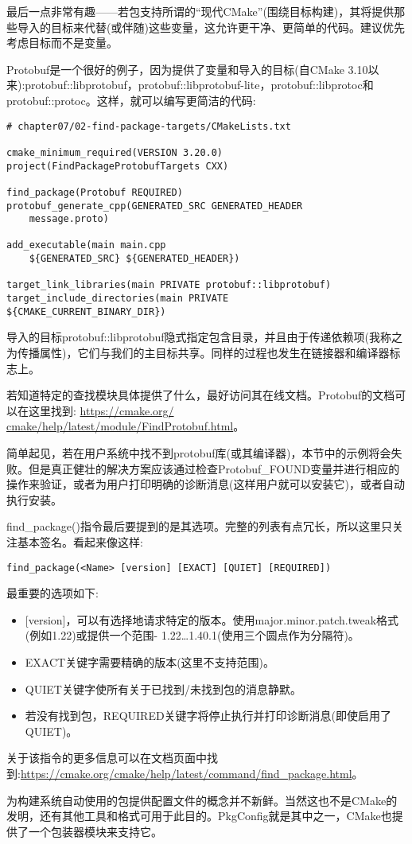 最后一点非常有趣——若包支持所谓的“现代CMake”(围绕目标构建)，其将提供那些导入的目标来代替(或伴随)这些变量，这允许更干净、更简单的代码。建议优先考虑目标而不是变量。

Protobuf是一个很好的例子，因为提供了变量和导入的目标(自CMake 3.10以来):protobuf::libprotobuf，protobuf::libprotobuf-lite，protobuf::libprotoc和protobuf::protoc。这样，就可以编写更简洁的代码:

\begin{lstlisting}[style=styleCMake]
# chapter07/02-find-package-targets/CMakeLists.txt

cmake_minimum_required(VERSION 3.20.0)
project(FindPackageProtobufTargets CXX)

find_package(Protobuf REQUIRED)
protobuf_generate_cpp(GENERATED_SRC GENERATED_HEADER
	message.proto)

add_executable(main main.cpp
	${GENERATED_SRC} ${GENERATED_HEADER})
	
target_link_libraries(main PRIVATE protobuf::libprotobuf)
target_include_directories(main PRIVATE
${CMAKE_CURRENT_BINARY_DIR})
\end{lstlisting}

导入的目标protobuf::libprotobuf隐式指定包含目录，并且由于传递依赖项(我称之为传播属性)，它们与我们的主目标共享。同样的过程也发生在链接器和编译器标志上。

若知道特定的查找模块具体提供了什么，最好访问其在线文档。Protobuf的文档可以在这里找到: \url{https://cmake.org/ cmake/help/latest/module/FindProtobuf.html}。

\begin{tcolorbox}[colback=blue!5!white,colframe=blue!75!black,title=重要的Note]
简单起见，若在用户系统中找不到protobuf库(或其编译器)，本节中的示例将会失败。但是真正健壮的解决方案应该通过检查Protobuf\_FOUND变量并进行相应的操作来验证，或者为用户打印明确的诊断消息(这样用户就可以安装它)，或者自动执行安装。
\end{tcolorbox}

find\_package()指令最后要提到的是其选项。完整的列表有点冗长，所以这里只关注基本签名。看起来像这样:

\begin{lstlisting}[style=styleCMake]
find_package(<Name> [version] [EXACT] [QUIET] [REQUIRED])
\end{lstlisting}

最重要的选项如下:

\begin{itemize}
\item 
{}[version]，可以有选择地请求特定的版本。使用major.minor.patch.tweak格式(例如1.22)或提供一个范围- 1.22…1.40.1(使用三个圆点作为分隔符)。

\item 
EXACT关键字需要精确的版本(这里不支持范围)。

\item 
QUIET关键字使所有关于已找到/未找到包的消息静默。

\item 
若没有找到包，REQUIRED关键字将停止执行并打印诊断消息(即使启用了QUIET)。
\end{itemize}

关于该指令的更多信息可以在文档页面中找到:\url{https://cmake.org/cmake/help/latest/command/find_package.html}。

为构建系统自动使用的包提供配置文件的概念并不新鲜。当然这也不是CMake的发明，还有其他工具和格式可用于此目的。PkgConfig就是其中之一，CMake也提供了一个包装器模块来支持它。





